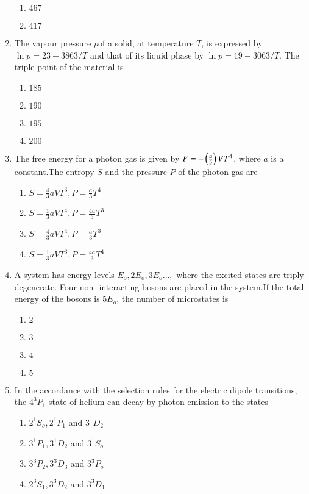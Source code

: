 \documentclass[journal]{IEEEtran}
\begin{document}
\begin{enumerate}
\begin{enumerate}
    \item $467$
    \item $417$
\end{enumerate}
\item The vapour pressure $p$of a solid, at temperature $T$, is expressed by $\ln{p}=23-3863/T$ and that of its liquid phase by $\ln{p}= 19-3063/T$. The triple point  of the material is 
\begin{enumerate}
    \item $185$
    \item $190$
    \item $195$
    \item $200$
\end{enumerate}
\item The free energy for a photon gas is given by $F = -\left(\frac{a}{3}\right)VT^4$, where $a$ is a constant.The entropy $S$ and the pressure $P$ of the photon gas are 
\begin{enumerate}
    \item $S=\frac{4}{3}aVT^3, P=\frac{a}{3}T^4$
    \item $S=\frac{1}{3}aVT^4, P=\frac{4a}{3}T^3$
    \item $S=\frac{4}{3}aVT^4, P=\frac{a}{3}T^3$
    \item $S=\frac{1}{3}aVT^3, P=\frac{4a}{3}T^4$
\end{enumerate}
\item A system has energy levels $E_o,2E_o,3E_o\dots,$ where the excited states are triply degenerate. Four non- interacting bosons are placed in the system.If the total energy of the bosons is $5E_o$, the number of microstates is 
\begin{enumerate}
    \item $2$
    \item $3$
    \item $4$
    \item $5$
\end{enumerate}
\item In the accordance with the selection rules for the electric dipole transitions, the $4^3P_1$ state of helium can decay by photon emission to the states 
\begin{enumerate}
    \item $2^1S_o,2^1P_1$ and $3^1D_2$
     \item $3^1P_1,3^1D_2$ and $3^1S_o$
      \item $3^3P_2,3^3D_3$ and $3^3P_o$
       \item $2^3S_1,3^3D_2$ and $3^3D_1$

\end{enumerate}
\end{enumerate}
\end{document}
